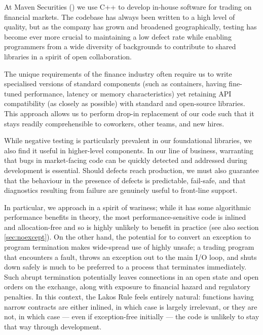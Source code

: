 At Maven Securities (\hyperref[https://www.mavensecurities.com/]{}) we use C++ to develop in-house software for trading on financial markets. The codebase has always been written to a high level of quality, but as the company has grown and broadened geographically, testing has become ever more crucial to maintaining a low defect rate while enabling programmers from a wide diversity of backgrounds to contribute to shared libraries in a spirit of open collaboration.

The unique requirements of the finance industry often require us to write specialised versions of standard components (such as containers, having fine-tuned performance, latency or memory characteristics) yet retaining API compatibility (as closely as possible) with standard and open-source libraries. This approach allows us to perform drop-in replacement of our code such that it stays readily comprehensible to coworkers, other teams, and new hires.

While negative testing is particularly prevalent in our foundational libraries, we also find it useful in higher-level components. In our line of business, warranting that bugs in market-facing code can be quickly detected and addressed during development is essential. Should defects reach production, we must also guarantee that the behaviour in the presence of defects is predictable, fail-safe, and that diagnostics resulting from failure are genuinely useful to front-line support.

In particular, we approach  in a spirit of wariness; while it has some algorithmic performance benefits in theory, the most performance-sensitive code is inlined and allocation-free and so is highly unlikely to benefit in practice (see also section \ref{sec:noexcept}). On the other hand, the potential for  to convert an exception to program termination makes wide-spread use of  highly unsafe; a trading program that encounters a fault, throws an exception out to the main I/O loop, and shuts down safely is much to be preferred to a process that terminates immediately.  Such abrupt termination potentially leaves connections in an open state and open orders on the exchange, along with exposure to financial hazard and regulatory penalties. In this context, the Lakos Rule feels entirely natural: functions having narrow contracts are either inlined, in which case 
is largely irrelevant, or they are not, in which case --- even if exception-free initially --- the code is unlikely to stay that way through development.

